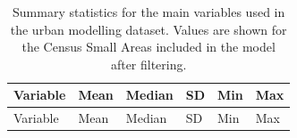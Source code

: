 \documentclass{article}
\begin{document}
\begin{longtable}[]{@{}
  >{\raggedright\arraybackslash}p{}
  >{\raggedleft\arraybackslash}p{}
  >{\raggedleft\arraybackslash}p{}
  >{\raggedleft\arraybackslash}p{}
  >{\raggedleft\arraybackslash}p{}
  >{\raggedleft\arraybackslash}p{}@{}}
\caption{Summary statistics for the main variables used in the urban
modelling dataset. Values are shown for the Census Small Areas included
in the model after filtering.}\tabularnewline
\toprule\noalign{}
\begin{minipage}[b]{\linewidth}\raggedright
Variable
\end{minipage} & \begin{minipage}[b]{\linewidth}\raggedleft
Mean
\end{minipage} & \begin{minipage}[b]{\linewidth}\raggedleft
Median
\end{minipage} & \begin{minipage}[b]{\linewidth}\raggedleft
SD
\end{minipage} & \begin{minipage}[b]{\linewidth}\raggedleft
Min
\end{minipage} & \begin{minipage}[b]{\linewidth}\raggedleft
Max
\end{minipage} \\
\midrule\noalign{}
\endfirsthead
\toprule\noalign{}
\begin{minipage}[b]{\linewidth}\raggedright
Variable
\end{minipage} & \begin{minipage}[b]{\linewidth}\raggedleft
Mean
\end{minipage} & \begin{minipage}[b]{\linewidth}\raggedleft
Median
\end{minipage} & \begin{minipage}[b]{\linewidth}\raggedleft
SD
\end{minipage} & \begin{minipage}[b]{\linewidth}\raggedleft
Min
\end{minipage} & \begin{minipage}[b]{\linewidth}\raggedleft
Max
\end{minipage} \\

\end{longtable}
\end{document}
